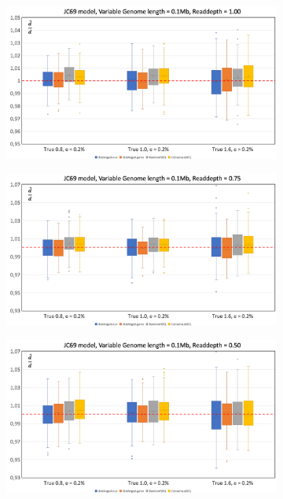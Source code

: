\documentclass{article}
\begin{document}
\begin{figure}[h]
\begin{subfigure}[b]{0.475\textwidth}
         \caption{}
         \label{fig:JCRD5_01Mb}
     \end{subfigure}
     \begin{subfigure}[b]{0.475\textwidth}
         \centering
         \includegraphics[width=\textwidth]{JCRD1_01Mb.png}
         \caption{}
         \label{fig:JCRD1_01Mb}
     \end{subfigure}
     \begin{subfigure}[b]{0.475\textwidth}
         \centering
         \includegraphics[width=\textwidth]{JCRD075_01Mb.png}
         \caption{}
         \label{fig:JCRD075_01Mb}
    \end{subfigure}
     \begin{subfigure}[b]{0.475\textwidth}
         \centering
         \includegraphics[width=\textwidth]{JCRD05_01Mb.png}

\end{subfigure}
\end{figure}
\end{document}
